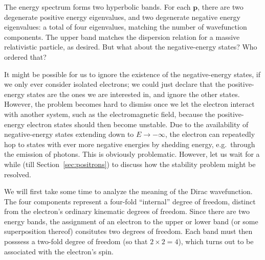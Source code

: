 \documentclass[pra,12pt]{revtex4}
\begin{document}
\noindent
The energy spectrum forms two hyperbolic bands.  For each
$\mathbf{p}$, there are two degenerate positive energy eigenvalues,
and two degenerate negative energy eigenvalues: a total of four
eigenvalues, matching the number of wavefunction components.  The
upper band matches the dispersion relation for a massive relativistic
particle, as desired.  But what about the negative-energy states?  Who
ordered that?

It might be possible for us to ignore the existence of the
negative-energy states, if we only ever consider isolated electrons;
we could just declare that the positive-energy states are the ones we
are interested in, and ignore the other states.  However, the problem
becomes hard to dismiss once we let the electron interact with another
system, such as the electromagnetic field, because the positive-energy
electron states should then become unstable.  Due to the availability
of negative-energy states extending down to $E\rightarrow -\infty$,
the electron can repeatedly hop to states with ever more negative
energies by shedding energy, e.g.~through the emission of photons.
This is obviously problematic.  However, let us wait for a while (till
Section~\ref{sec:positrons}) to discuss how the stability problem
might be resolved.

We will first take some time to analyze the meaning of the Dirac
wavefunction.  The four components represent a four-fold ``internal''
degree of freedom, distinct from the electron's ordinary kinematic
degrees of freedom.  Since there are two energy bands, the assignment
of an electron to the upper or lower band (or some superposition
thereof) consitutes two degrees of freedom.  Each band must then
posssess a two-fold degree of freedom (so that $2\times 2 = 4$), which
turns out to be associated with the electron's spin.
\end{document}
